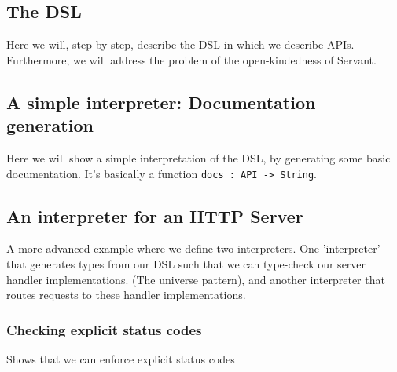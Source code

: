 \documentclass[12pt,a4paper]{article}
\begin{document}
\subsection{The DSL}
Here we will, step by step, describe the DSL in which we describe APIs.
Furthermore, we will address the problem of the open-kindedness of Servant.
\subsection{A simple interpreter: Documentation generation}
Here we will show a simple interpretation of the DSL, by generating some basic documentation.
It's basically a function \texttt{docs : API -> String}. 
\subsection{An interpreter for an HTTP Server}
A more advanced example where we define two interpreters. One 'interpreter' that generates types from our DSL such that we can type-check our server handler implementations. (The universe pattern), and another interpreter that routes requests to these handler implementations.
\subsubsection{Checking explicit status codes}
Shows that we can enforce explicit status codes
\end{document}
